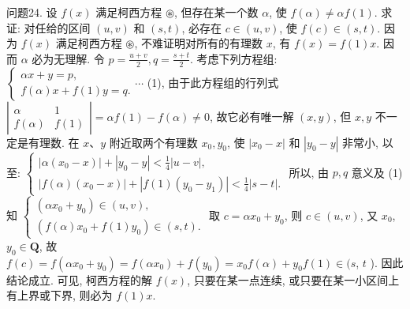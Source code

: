 问题24. 设 $f(x)$ 满足柯西方程 $\circledast$, 但存在某一个数 $\alpha$, 使 $f(\alpha) \neq \alpha f(1)$. 求证: 对任给的区间 $(u, v)$ 和 $(s, t)$, 必存在 $c \in(u, v)$, 使 $f(c) \in(s, t)$.
因为 $f(x)$ 满足柯西方程 $\circledast$, 不难证明对所有的有理数 $x$, 有 $f(x)= f(1) x$. 因而 $\alpha$ 必为无理解.
令 $p=\frac{u+v}{2}, q=\frac{s+t}{2}$. 考虑下列方程组: $\left\{\begin{array}{l}\alpha x+y=p, \\ f(\alpha) x+f(1) y=q .\end{array}\right. \cdots$ (1), 由于此方程组的行列式 $\left|\begin{array}{cc}\alpha & 1 \\ f(\alpha) & f(1)\end{array}\right|=\alpha f(1)- f(\alpha) \neq 0$, 故它必有唯一解 $(x, y)$, 但 $x, y$ 不一定是有理数.
在 $x 、 y$ 附近取两个有理数 $x_0, y_0$, 使 $\left|x_0-x\right|$ 和 $\left|y_0-y\right|$ 非常小, 以至: $\left\{\begin{array}{l}\left|\alpha\left(x_0-x\right)\right|+\left|y_0-y\right|<\frac{1}{4}|u-v|, \\ \left|f(\alpha)\left(x_0-x\right)\right|+\left|f(1)\left(y_0-y_1\right)\right|<\frac{1}{4}|s-t| .\end{array}\right.$
所以, 由 $p, q$ 意义及 (1)知 $\left\{\begin{array}{l}\left(\alpha x_0+y_0\right) \in(u, v), \\ \left(f(\alpha) x_0+f(1) y_0\right) \in(s, t) .\end{array}\right.$ 
取 $c=\alpha x_0+y_0$, 则 $c \in(u, v)$, 又 $x_0$, $y_0 \in \mathbf{Q}$, 故 $f(c)=f\left(\alpha x_0+y_0\right)=f\left(\alpha x_0\right)+f\left(y_0\right)=x_0 f(\alpha)+y_0 f(1) \in(s$, $t$ ). 因此结论成立.
可见, 柯西方程的解 $f(x)$, 只要在某一点连续, 或只要在某一小区间上有上界或下界, 则必为 $f(1) x$.



